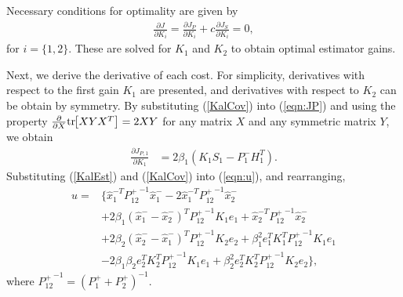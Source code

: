 \documentclass[letterpaper, 10pt, conference]{ieeeconf}
\newcommand{\bracket}[1]{\ensuremath{\left[ #1 \right]}}
\newcommand{\refeqn}[1]{(\ref{eqn:#1})}
\newcommand{\tr}[1]{\mathrm{tr}\ensuremath{\negthickspace\bracket{#1}}}
\newcommand{\deriv}[2]{\ensuremath{\frac{\partial #1}{\partial #2}}}
\newcommand{\EditTL}[1]{{\color{red}\protect #1}}
\renewcommand{\EditTL}[1]{{\protect #1}}
\begin{document}
Necessary conditions for optimality are given by
\begin{align}
\deriv{J}{K_i} = \deriv{J_P}{K_i} + c \deriv{J_S}{K_i} =0,\label{eqn:NCO}
\end{align}
for $i=\{1,2\}$. These are solved for $K_1$ and $K_2$ to obtain optimal estimator gains. 





Next, we derive the derivative of each cost. For simplicity, derivatives with respect to the first gain $K_1$ are presented, and derivatives with respect to $K_2$ can be obtain by symmetry. By substituting (\ref{KalCov}) into \refeqn{JP} and using the property $\frac{\partial}{\partial X}\tr{XYX^T}=2XY$ for any matrix $X$ and any symmetric matrix $Y$, we obtain
\begin{align}
\label{CostP}
\frac{\partial J_{P,1}}{\partial K_{1}}&=2\beta_1({K_1S_1-P_1^-H_1^T}).
\end{align}
%
Substituting (\ref{KalEst}) and (\ref{KalCov}) into \refeqn{u}, and rearranging, 
\begin{align}
u%
=&\{\hat x_1^{-T}{P^+_{12}}^{-1}\hat x_1^-
-2\hat x_1^{-T}{P^+_{12}}^{-1}\hat x_2^-\nonumber\\
&+2\beta_1(\hat x_1^{-}-\hat x_2^{-})^T{P^+_{12}}^{-1}K_1e_1
+\hat x_2^{-T}{P^+_{12}}^{-1}\hat x_2^-\nonumber\\
&+2\beta_2(\hat x_2^{-}-\hat x_1^{-})^T{P^+_{12}}^{-1}K_2e_2
+\beta_1^2e_1^TK_1^T{P^+_{12}}^{-1}K_1e_1\nonumber\\
&-2\beta_1\beta_2e_2^TK_2^T{P^+_{12}}^{-1}K_1e_1+\beta_2^2e_2^TK_2^T{P^+_{12}}^{-1}K_2e_2\},
\end{align}
where ${P^+_{12}}^{-1}=(P_1^++P_2^+)^{-1}$. 
\end{document}
